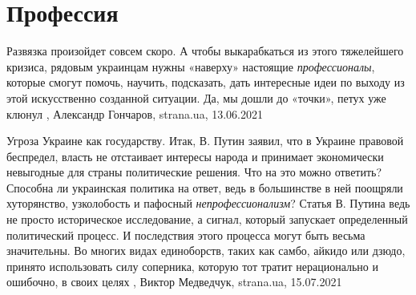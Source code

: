  
 
 
 
 
\chapter{Профессия}
\label{sec:slova.professia}

Развязка произойдет совсем скоро. А чтобы выкарабкаться из этого тяжелейшего
кризиса, рядовым украинцам нужны «наверху» настоящие \emph{профессионалы}, которые
смогут помочь, научить, подсказать, дать интересные идеи по выходу из этой
искусственно созданной ситуации. Да, мы дошли до «точки», петух уже клюнул
, 
Александр Гончаров, strana.ua, 13.06.2021

Угроза Украине как государству.  Итак, В. Путин заявил, что в Украине правовой
беспредел, власть не отстаивает интересы народа и принимает экономически
невыгодные для страны политические решения. Что на это можно ответить? Способна
ли украинская политика на ответ, ведь в большинстве в ней поощряли хуторянство,
узколобость и пафосный \emph{непрофессионализм}?  Статья В. Путина ведь не
просто историческое исследование, а сигнал, который запускает определенный
политический процесс. И последствия этого процесса могут быть весьма
значительны. Во многих видах единоборств, таких как самбо, айкидо или дзюдо,
принято использовать силу соперника, которую тот тратит нерационально и
ошибочно, в своих целях
, 
Виктор Медведчук, strana.ua, 15.07.2021
